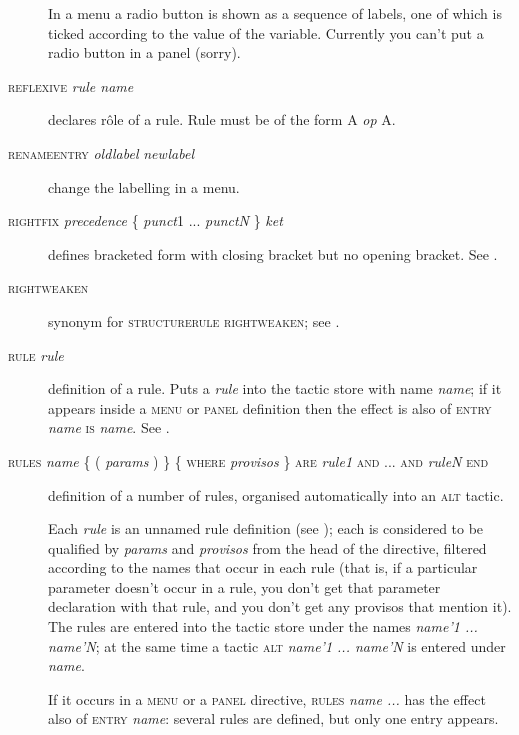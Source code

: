 \begin{description}
In a menu a radio button is shown as a sequence of labels, one of which is ticked according to the value of the variable. Currently you can't put a radio button in a panel (sorry).%

\item[\textsc{reflexive} \textit{rule name}] declares r\^ole of a rule. Rule must be of the form A \textit{op} A.

\item[\textsc{renameentry} \textit{oldlabel} \textit{newlabel}] change the labelling in a menu.

\item[\textsc{rightfix} \textit{precedence} \{ \textit{punct}1 ... \textit{punctN} \} \textit{ket}] defines bracketed form with closing bracket but no opening bracket. See .

\item[\textsc{rightweaken}] synonym for \textsc{structurerule} \textsc{rightweaken}; see .

\item[\textsc{rule} \textit{rule}] definition of a rule. Puts a \textit{rule} into the tactic store with name \textit{name}; if it appears inside a \textsc{menu} or \textsc{panel} definition then the effect is also of \textsc{entry} \textit{name} \textsc{is} \textit{name}. See .

\item[\textsc{rules} \textit{name} \{ ( \textit{params} ) \} \{ \textsc{where} \textit{provisos} \} \textsc{are} \textit{rule1} \textsc{and ... and} \textit{ruleN} \textsc{end}] definition of a number of rules, organised automatically into an \textsc{alt} tactic.

Each \textit{rule} is an unnamed rule definition (see ); each is considered to be qualified by \textit{params} and \textit{provisos} from the head of the directive, filtered according to the names that occur in each rule (that is, if a particular parameter doesn't occur in a rule, you don't get that parameter declaration with that rule, and you don't get any provisos that mention it). The rules are entered into the tactic store under the names \textit{name'1 ... name'N}; at the same time a tactic \textsc{alt} \textit{name'1 ... name'N} is entered under \textit{name}.

If it occurs in a \textsc{menu} or a \textsc{panel} directive, \textsc{rules} \textit{name ...} has the effect also of \textsc{entry} \textit{name}: several rules are defined, but only one entry appears.


\end{description}
